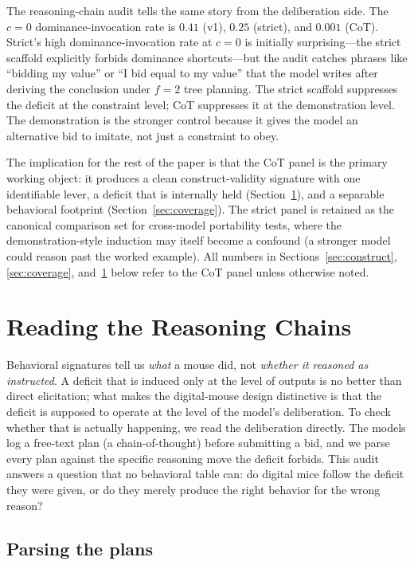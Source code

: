 \documentclass[12pt]{article}
\begin{document}
The reasoning-chain audit tells the same story from the
deliberation side. The $c{=}0$ dominance-invocation rate is $0.41$
(v1), $0.25$ (strict), and $0.001$ (CoT). Strict's high
dominance-invocation rate at $c{=}0$ is initially surprising---the
strict scaffold explicitly forbids dominance shortcuts---but the
audit catches phrases like ``bidding my value'' or ``I bid equal to
my value'' that the model writes after deriving the conclusion under
$f{=}2$ tree planning. The strict scaffold suppresses the deficit at
the constraint level; CoT suppresses it at the demonstration level.
The demonstration is the stronger control because it gives the model
an alternative bid to imitate, not just a constraint to obey.

The implication for the rest of the paper is that the CoT panel is
the primary working object: it produces a clean construct-validity
signature with one identifiable lever, a deficit that is
internally held (Section~\ref{sec:audit}), and a separable
behavioral footprint (Section~\ref{sec:coverage}). The strict panel
is retained as the canonical comparison set for cross-model
portability tests, where the demonstration-style induction may
itself become a confound (a stronger model could reason past the
worked example). All numbers in Sections~\ref{sec:construct},
\ref{sec:coverage}, and~\ref{sec:audit} below refer to the CoT
panel unless otherwise noted.

\section{Reading the Reasoning Chains}
\label{sec:audit}

Behavioral signatures tell us \emph{what} a mouse did, not
\emph{whether it reasoned as instructed}. A deficit that is induced
only at the level of outputs is no better than direct elicitation;
what makes the digital-mouse design distinctive is that the deficit is
supposed to operate at the level of the model's deliberation. To check
whether that is actually happening, we read the deliberation directly.
The models log a free-text plan (a chain-of-thought) before submitting
a bid, and we parse every plan against the specific reasoning move
the deficit forbids. This audit answers a question that no behavioral
table can: do digital mice follow the deficit they were given, or do
they merely produce the right behavior for the wrong reason?

\subsection{Parsing the plans}
\end{document}
